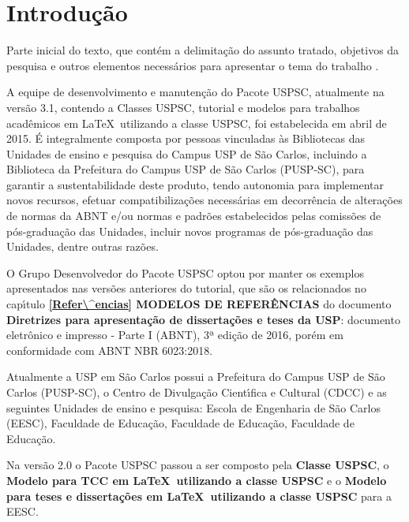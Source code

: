 
\chapter[Introdu\c{c}\~ao]{Introdu\c{c}\~ao}
\label{Introdu\c{c}\~ao}

Parte inicial do texto, que cont\'em a delimita\c{c}\~ao do assunto tratado, objetivos da pesquisa e outros elementos necess\'arios para apresentar o tema do trabalho \cite{aguia2020}.

A equipe de desenvolvimento e manuten\c{c}\~ao do Pacote USPSC, atualmente na vers\~ao 3.1, contendo a Classes USPSC, tutorial e modelos para trabalhos acad\^emicos em \LaTeX\ utilizando a classe USPSC, foi estabelecida em abril de 2015. \'E integralmente composta por pessoas vinculadas \`as Bibliotecas das Unidades de ensino e pesquisa do Campus USP de S\~ao Carlos, incluindo a Biblioteca da Prefeitura do Campus USP de S\~ao Carlos (PUSP-SC), para garantir a sustentabilidade deste produto, tendo autonomia para implementar novos recursos, efetuar compatibiliza\c{c}\~oes necess\'arias em decorr\^encia de altera\c{c}\~oes de normas da ABNT e/ou normas e padr\~oes estabelecidos pelas comiss\~oes de p\'os-gradua\c{c}\~ao das Unidades, incluir novos programas de p\'os-gradua\c{c}\~ao das Unidades, dentre outras raz\~oes.

O Grupo Desenvolvedor do Pacote USPSC optou por manter os exemplos apresentados nas vers\~oes anteriores do tutorial, que s\~ao os relacionados no cap\'{\i}tulo \textbf{\ref{Refer\^encias} MODELOS DE REFER\^ENCIAS} do documento \textbf{Diretrizes para apresenta\c{c}\~ao de disserta\c{c}\~oes e teses da USP}: documento eletr\^onico e impresso - Parte I (ABNT), 3ª edi\c{c}\~ao de 2016, por\'em em conformidade com ABNT NBR 6023:2018. 

Atualmente a USP em S\~ao Carlos possui a Prefeitura do Campus USP de S\~ao Carlos (PUSP-SC), o Centro de Divulga\c{c}\~ao Cient\'{\i}fica e Cultural (CDCC) e as seguintes Unidades de ensino e pesquisa: Escola de Engenharia de S\~ao Carlos (EESC), Faculdade de Educa\c{c}\~ao, Faculdade de Educa\c{c}\~ao, Faculdade de Educa\c{c}\~ao.

Na vers\~ao 2.0 o Pacote USPSC passou a ser composto pela \textbf{Classe USPSC}, o \textbf{Modelo para TCC em \LaTeX\ utilizando a classe USPSC} e o \textbf{Modelo para teses e disserta\c{c}\~oes em \LaTeX\ utilizando a classe USPSC} para a EESC.

